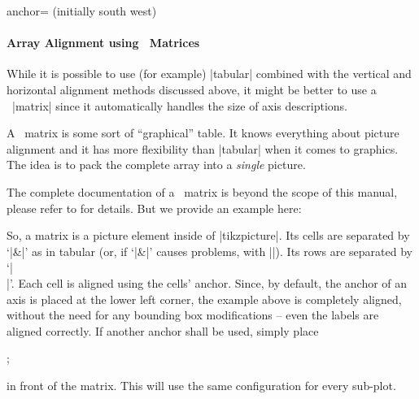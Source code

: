 \begin{pgfplotskey}{anchor= (initially south west)}
\begin{minipage}
\begin{tabular}
\begin{center}
\paragraph{Array Alignment using \Tikz\ Matrices}
While it is possible to use (for example) |tabular| combined with the vertical and horizontal alignment methods discussed above, it might be better to use a \Tikz\ |matrix| since it automatically handles the size of axis descriptions.

A \Tikz\ matrix is some sort of ``graphical'' table. It knows everything about picture alignment and it has more flexibility than |tabular| when it comes to graphics. The idea is to pack the complete array into a \emph{single} picture.

The complete documentation of a \Tikz\ matrix is beyond the scope of this manual, please refer to \cite{tikz} for details. But we provide an example here:
%
\begin{codeexample}[]
\end{codeexample}
\noindent So, a matrix is a picture element inside of |tikzpicture|. Its cells are separated by `|&|' as in tabular (or, if `|&|' causes problems, with |\pgfmatrixnextcell|). Its rows are separated by `|\\|'. Each cell is aligned using the cells' anchor. Since, by default, the anchor of an axis is placed at the lower left corner, the example above is completely aligned, without the need for any bounding box modifications -- even the labels are aligned correctly. If another anchor shall be used, simply place 
\begin{codeexample}
\pgfplotsset{anchor=....}
;
\end{codeexample}
\noindent in front of the matrix. This will use the same configuration for every sub-plot.


\end{center}
\end{tabular}
\end{minipage}
\end{pgfplotskey}
